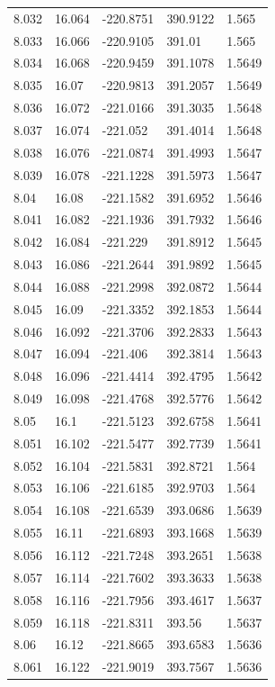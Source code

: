 \begin{tabular}{lllll}
8.032 & 16.064 & -220.8751 & 390.9122 & 1.565 \\
8.033 & 16.066 & -220.9105 & 391.01 & 1.565 \\
8.034 & 16.068 & -220.9459 & 391.1078 & 1.5649 \\
8.035 & 16.07 & -220.9813 & 391.2057 & 1.5649 \\
8.036 & 16.072 & -221.0166 & 391.3035 & 1.5648 \\
8.037 & 16.074 & -221.052 & 391.4014 & 1.5648 \\
8.038 & 16.076 & -221.0874 & 391.4993 & 1.5647 \\
8.039 & 16.078 & -221.1228 & 391.5973 & 1.5647 \\
8.04 & 16.08 & -221.1582 & 391.6952 & 1.5646 \\
8.041 & 16.082 & -221.1936 & 391.7932 & 1.5646 \\
8.042 & 16.084 & -221.229 & 391.8912 & 1.5645 \\
8.043 & 16.086 & -221.2644 & 391.9892 & 1.5645 \\
8.044 & 16.088 & -221.2998 & 392.0872 & 1.5644 \\
8.045 & 16.09 & -221.3352 & 392.1853 & 1.5644 \\
8.046 & 16.092 & -221.3706 & 392.2833 & 1.5643 \\
8.047 & 16.094 & -221.406 & 392.3814 & 1.5643 \\
8.048 & 16.096 & -221.4414 & 392.4795 & 1.5642 \\
8.049 & 16.098 & -221.4768 & 392.5776 & 1.5642 \\
8.05 & 16.1 & -221.5123 & 392.6758 & 1.5641 \\
8.051 & 16.102 & -221.5477 & 392.7739 & 1.5641 \\
8.052 & 16.104 & -221.5831 & 392.8721 & 1.564 \\
8.053 & 16.106 & -221.6185 & 392.9703 & 1.564 \\
8.054 & 16.108 & -221.6539 & 393.0686 & 1.5639 \\
8.055 & 16.11 & -221.6893 & 393.1668 & 1.5639 \\
8.056 & 16.112 & -221.7248 & 393.2651 & 1.5638 \\
8.057 & 16.114 & -221.7602 & 393.3633 & 1.5638 \\
8.058 & 16.116 & -221.7956 & 393.4617 & 1.5637 \\
8.059 & 16.118 & -221.8311 & 393.56 & 1.5637 \\
8.06 & 16.12 & -221.8665 & 393.6583 & 1.5636 \\
8.061 & 16.122 & -221.9019 & 393.7567 & 1.5636 \\

\end{tabular}
